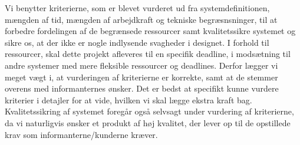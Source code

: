 Vi benytter kriterierne, som er blevet vurderet ud fra systemdefinitionen, mængden af tid, mængden af arbejdkraft og tekniske begræsnsninger, til at forbedre fordelingen af de begrænsede ressourcer samt kvalitetssikre systemet og sikre os, at der ikke er nogle indlysende svagheder i designet. I forhold til ressourcer, skal dette projekt afleveres til en specifik deadline, i modsætning til andre systemer med mere fleksible ressourcer og deadlines. Derfor lægger vi meget vægt i, at vurderingen af kriterierne er korrekte, samt at de stemmer overens med informanternes ønsker. Det er bedst at specifikt kunne vurdere kriterier i detajler for at vide, hvilken vi skal lægge ekstra kraft bag. Kvalitetssikring af systemet foregår også selvsagt under vurdering af kriterierne, da vi naturligvis ønsker et produkt af høj kvalitet, der lever op til de opstillede krav som informanterne/kunderne kræver.